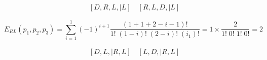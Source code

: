 \begin{align*}
    & [D, R, L, | L] \quad [R, L, D, | L] 
\end{align*}


\begin{equation*}
    E_{RL}(p_1, p_2, p_3) = \sum_{i=1}^{1} (-1)^{i+1} 
    \frac{(1+1+2-i-1)!}{1! \; (1-i)! \; (2-i)! \; (i_1)!} 
    = 1 \times \frac{2}{1! \; 0! \; 1! \; 0!} = 2
\end{equation*}

\begin{align*}
    & [D, L, | R, L] \quad [L, D, | R, L] 
\end{align*}



